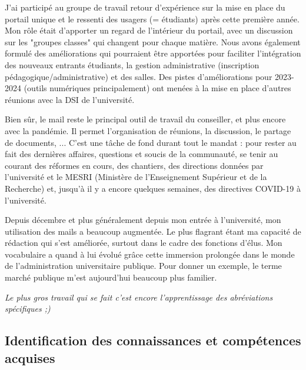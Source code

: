 \documentclass{article}
\begin{document}
J'ai participé au groupe de travail retour d'expérience sur la mise en place du portail unique et le ressenti des usagers (= étudiants) après cette première année. Mon rôle était d'apporter un regard de l'intérieur du portail, avec un discussion sur les "groupes classes" qui changent pour chaque matière. Nous avons également formulé des améliorations qui pourraient être apportées pour faciliter l'intégration des nouveaux entrants étudiants, la gestion administrative (inscription pédagogique/administrative) et des salles. Des pistes d'améliorations pour 2023-2024 (outils numériques principalement) ont menées à la mise en place d'autres réunions avec la DSI de l'université.

Bien sûr, le mail reste le principal outil de travail du conseiller, et plus encore avec la pandémie. Il permet l'organisation de réunions, la discussion, le partage de documents, ... C'est une tâche de fond durant tout le mandat : pour rester au fait des dernières affaires, questions et soucis de la communauté, se tenir au courant des réformes en cours, des chantiers, des directions données par l'université et le MESRI (Ministère de l'Enseignement Supérieur et de la Recherche) et, jusqu'à il y a encore quelques semaines, des directives COVID-19 à l'université.

Depuis décembre et plus généralement depuis mon entrée à l'université, mon utilisation des mails a beaucoup augmentée. Le plus flagrant étant ma capacité de rédaction qui s'est améliorée, surtout dans le cadre des fonctions d'élus. Mon vocabulaire a quand à lui évolué grâce cette immersion prolongée dans le monde de l'administration universitaire publique. Pour donner un exemple, le terme marché publique m'est aujourd'hui beaucoup plus familier. 

\textit{Le plus gros travail qui se fait c'est encore l'apprentissage des abréviations spécifiques ;)}
\subsection{Identification des connaissances et compétences acquises}
\end{document}
